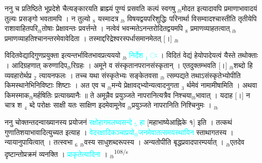 \documentclass[article,12pt,a4paper]{memoir}%
\newcommand{\quotelemma}[1]{\textcolor{cyan}{#1}}
\newcounter{parCount}
\begin{document}
	  
	  \pstart \leavevmode%
	\hphantom{.}ननु च प्रतिष्ठिते भूप्रदेशे चैत्यङ्कारयति ब्राह्म्यं पुण्यं प्रसवति कल्पं स्वगषु {\tiny $_{lb}$}मोदत इत्यादावपि प्रमाणाभावादयं तुल्यः प्रसङ्गो भवतामपि । न तुल्यो {\tiny $_{8}$} यस्मादत्र {\tiny $_{lb}$} \leavevmode{} विषयद्वयपरिशुद्धिः परिनार्था  विसम्वादश्चास्तीति तृतीयेपि राशावाहितपरि{\tiny $_{lb}$}तोषाः प्रेक्षावन्तः प्रवर्त्तन्ते । नत्वेवं भवन्मतेऽनन्तरोदितद्वयमपि {\tiny $_{8}$} \leavevmode{} प्रमाणव्याहतत्वात् {\tiny $_{lb}$}प्रमाणव्याहतिश्चानन्तरमेवावेदिता । तस्माद्दरिद्रेश्वरस्पर्धासमानमेतत् [।]
	{}
	\pend%
      {\tiny $_{lb}$}

	  
	  \pstart \leavevmode%
	विदितवेद्यादिगुणप्रयुक्ता \cite[15a2]{vn-msN} इत्यन्तर्भावितभावप्रत्यययो {\tiny $_{lb}$} \quotelemma{निर्देश {\tiny $_{1}$} ः} । विदितं वेद्यं हेयोपादेयत्वं यैस्ते तथोक्ताः । आदिग्रहणात् करुणादिप{\tiny $_{lb}$}रिग्रहः । अमूने \cite[5a2]{vn-msN} व संस्कृतानपरानसंस्कृतान् । एतदुक्तम्भवति [।] {\tiny $_{lb}$}शब्दो हि व्यवहारोर्थप्र {\tiny $_{2}$} त्यायनफलः । तच्च यथा संस्कृतेभ्यः सङ्केतवसा {\tiny $_{lb}$} त्सम्पद्यते तथाऽसंस्कृतेभ्योपीति किमस्थानेभिनिविष्टाः शिष्टाः । अत एव च {\tiny $_{lb}$}मन्ये प्रेक्षावद्भ्योन्यत्वादनुगता {\tiny $_{3}$} र्थमेवं नामामीषामिति । अथवा किमस्माक{\tiny $_{lb}$}मर्हषितिः प्रत्याख्यानैः ॥ ते अमून्नैव प्रयुञ्जते नापरानित्यत्रैव निश्चया{\tiny $_{lb}$}भावात् । यदाह [।] न चात्र श {\tiny $_{4}$} ब्दे परोक्षः साक्षी यतः साक्षिण इदमेवामूनेव {\tiny $_{lb}$}प्रयुञ्जते नापरानिति निश्चिनुमः \cite[15a3]{vn-msN} ।
	{}
	\pend%
      {\tiny $_{lb}$}

	  
	  \pstart \leavevmode%
	\hphantom{.}ननु चोक्तन्तदन्वाख्यानस्य प्रयोजनं \quotelemma{रक्षोहागमलघ्वसन्दे {\tiny $_{5}$} हा} [महाभाष्येआह्निके १] इति । तत्कथं गुणातिशयाभावादित्युच्यत इत्याह । \quotelemma{वेदरक्षादिकञ्चाप्रयो{\tiny $_{lb}$}जनमेवातत्समयस्थायिन} \cite[15a4]{vn-msN} स्ताथागतस्य । न्यायानुपायित्वात् । तत्स्वभा {\tiny $_{6}$} {\tiny $_{lb}$}वस्य \cite[15a4]{vn-msN} साधुशब्दरूपस्य । अन्यतोपीति \cite[15a4]{vn-msN} बृद्धप्रवादपारम्पर्यात् । {\tiny $_{lb}$}एतदेव दृष्टान्तोप्रक्रमं व्यनक्ति । \quotelemma{प्राकृतेत्यादिना} \cite[15a4]{vn-msN} ।
	{}
	\pend%
      {\tiny $_{lb}$}\textsuperscript{\textenglish{108/s}}
\end{document}
